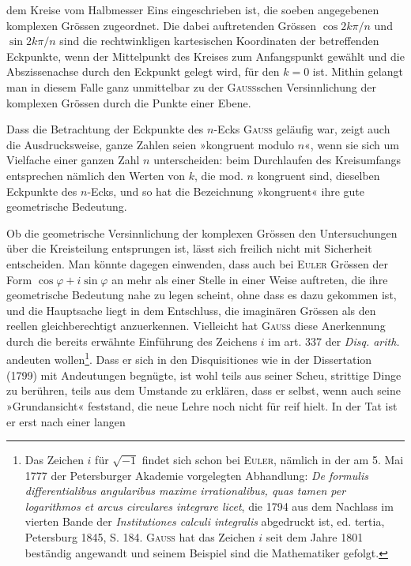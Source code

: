 dem Kreise vom Halbmesser Eins eingeschrieben ist, die soeben angegebenen
komplexen Grössen zugeordnet. Die dabei auftretenden Grössen \(\cos 2k\pi/n\)
und \(\sin 2k\pi/n\) sind die rechtwinkligen kartesischen Koordinaten der betreffenden
Eckpunkte, wenn der Mittelpunkt des Kreises zum Anfangspunkt
gewählt und die Abszissenachse durch den Eckpunkt gelegt wird, für den
\(k=0\) ist. Mithin gelangt man in diesem Falle ganz unmittelbar zu der
\textsc{Gauss}schen Versinnlichung der komplexen Grössen durch die Punkte einer
Ebene.
\par
Dass die Betrachtung der Eckpunkte des \(n\)-Ecks \textsc{Gauss} geläufig war,
zeigt auch die Ausdrucksweise, ganze Zahlen seien »kongruent modulo \(n\)«,
wenn sie sich um Vielfache einer ganzen Zahl \(n\) unterscheiden: beim Durchlaufen
des Kreisumfangs entsprechen nämlich den Werten von \(k\), die mod. \(n\)
kongruent sind, dieselben Eckpunkte des \(n\)-Ecks, und so hat die Bezeichnung
»kongruent« ihre gute geometrische Bedeutung.
\par
Ob die geometrische Versinnlichung der komplexen Grössen den Untersuchungen
über die Kreisteilung entsprungen ist, lässt sich freilich nicht mit
Sicherheit entscheiden. Man könnte dagegen einwenden, dass auch bei \textsc{Euler}
Grössen der Form \(\cos\varphi+i\sin\varphi\) an mehr als einer Stelle in einer Weise auftreten,
die ihre geometrische Bedeutung nahe zu legen scheint, ohne dass es
dazu gekommen ist, und die Hauptsache liegt in dem Entschluss, die imaginären
Grössen als den reellen gleichberechtigt anzuerkennen. Vielleicht hat
\textsc{Gauss} diese Anerkennung durch die bereits erwähnte Einführung des Zeichens
\(i\) im art. 337 der \textit{Disq. arith.} andeuten wollen\footnote{Das Zeichen \(i\) für \(\surd{-1}\) findet sich  schon bei \textsc{Euler}, nämlich in der am 5. Mai 1777 der Petersburger Akademie vorgelegten Abhandlung: \textit{De formulis differentialibus angularibus maxime irrationalibus, quas tamen per logarithmos et arcus circulares integrare licet}, die 1794 aus dem Nachlass im vierten Bande der \textit{Institutiones calculi integralis} abgedruckt ist, ed. tertia, Petersburg 1845, S. 184. \textsc{Gauss} hat das Zeichen \(i\) seit dem Jahre 1801 beständig angewandt und seinem Beispiel sind die Mathematiker gefolgt.}. Dass er sich in den Disquisitiones
wie in der Dissertation (1799) mit Andeutungen begnügte, ist wohl
teils aus seiner Scheu, strittige Dinge zu berühren, teils aus dem Umstande
zu erklären, dass er selbst, wenn auch seine »Grundansicht« feststand, die neue
Lehre noch nicht für reif hielt. In der Tat ist er erst nach einer langen
